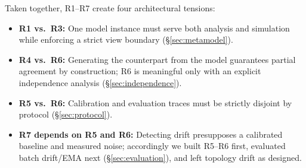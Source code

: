 Taken together, R1--R7 create four architectural tensions:
\begin{itemize}[leftmargin=*,nosep]
  \item \textbf{R1 vs.\ R3:} One model instance must serve both analysis and simulation while enforcing a strict view boundary (\S\ref{sec:metamodel}).
  \item \textbf{R4 vs.\ R6:} Generating the counterpart from the model guarantees partial agreement by construction; R6 is meaningful only with an explicit independence analysis (\S\ref{sec:independence}).
  \item \textbf{R5 vs.\ R6:} Calibration and evaluation traces must be strictly disjoint by protocol (\S\ref{sec:protocol}).
  \item \textbf{R7 depends on R5 and R6:} Detecting drift presupposes a calibrated baseline and measured noise; accordingly we built R5--R6 first, evaluated batch drift/EMA next (\S\ref{sec:evaluation}), and left topology drift as designed.
\end{itemize}
